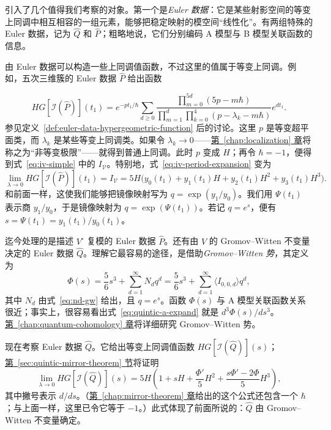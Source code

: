  引入了几个值得我们考察的对象。第一个是\emph{Euler 数据}：它是某些射影空间的等变上同调中相互相容的一组元素，能够把稳定映射的模空间“线性化”。有两组特殊的 Euler 数据，记为 $\widehat Q$ 和 $\widehat P$；粗略地说，它们分别编码 A 模型与 B 模型关联函数的信息。

由 Euler 数据可以构造一些上同调值函数，不过这里的值属于等变上同调。例如，五次三维簇的 Euler 数据 $\widehat P$ 给出函数

\[
HG[\mathcal I(\widehat P)](t_1)
=e^{-pt_1/\hbar}\sum_{d\geq0}
\frac{\prod_{m=0}^{5d}(5p-m\hbar)}{
\prod_{m=1}^{d}\prod_{k=0}^{4}(p-\lambda_k-m\hbar)}e^{dt_1}.
\]
参见定义~\ref{def:euler-data-hypergeometric-function} 后的讨论。这里 $p$ 是等变超平面类，而 $\lambda_k$ 是某些等变上同调类。如果令 $\lambda_k\to0$——\hyperref[chap:localization]{第~\ref*{chap:localization} 章}将称之为“非等变极限”——就得到普通上同调。此时 $p$ 变成 $H$；再令 $\hbar=-1$，便得到式~\eqref{eq:iv-simple} 中的 $I_{\mathcal V}$。特别地，式~\eqref{eq:iv-period-expansion} 变为
\begin{equation}\label{eq:euler-p-limit}
\lim_{\lambda\to0}HG[\mathcal I(\widehat P)](t_1)
=I_{\mathcal V}=5H\bigl(y_0(t_1)+y_1(t_1)H+y_2(t_1)H^2+y_3(t_1)H^3\bigr).
\end{equation}
和前面一样，这使我们能够把镜像映射写为 $q=\exp(y_1/y_0)$。我们用 $\Psi(t_1)$ 表示商 $y_1/y_0$，于是镜像映射为 $q=\exp(\Psi(t_1))$。若记 $q=e^s$，便有 $s=\Psi(t_1)=y_1(t_1)/y_0(t_1)$。

迄今处理的是描述 $V^\circ$ 复模的 Euler 数据 $\widehat P$。还有由 $V$ 的 Gromov--Witten 不变量决定的 Euler 数据 $\widehat Q$。理解它最容易的途径，是借助\emph{Gromov--Witten 势}，其定义为
\begin{equation}\label{eq:gw-potential-quintic}
\Phi(s)=\frac56s^3+\sum_{d=1}^{\infty}N_dq^d
=\frac56s^3+\sum_{d=1}^{\infty}\langle I_{0,0,d}\rangle q^d,
\end{equation}
其中 $N_d$ 由式~\eqref{eq:nd-gw} 给出，且 $q=e^s$。函数 $\Phi(s)$ 与 A 模型关联函数关系很近；事实上，很容易看出式~\eqref{eq:quintic-a-expand} 就是 $d^3\Phi(s)/ds^3$。\hyperref[chap:quantum-cohomology]{第~\ref*{chap:quantum-cohomology} 章}将详细研究 Gromov--Witten 势。

现在考察 Euler 数据 $\widehat Q$。它给出等变上同调值函数 $HG[\mathcal I(\widehat Q)](s)$；\hyperref[sec:quintic-mirror-theorem]{第~\ref*{sec:quintic-mirror-theorem} 节}将证明
\begin{equation}\label{eq:euler-q-limit}
\lim_{\lambda\to0}HG[\mathcal I(\widehat Q)](s)
=5H\left(1+sH+\frac{\Phi'}5H^2+\frac{s\Phi'-2\Phi}5H^3\right),
\end{equation}
其中撇号表示 $d/ds$。（\hyperref[chap:mirror-theorem]{第~\ref*{chap:mirror-theorem} 章}给出的这个公式还包含一个 $\hbar$；与上面一样，这里已令它等于 $-1$。）此式体现了前面所说的：$\widehat Q$ 由 Gromov--Witten 不变量确定。

